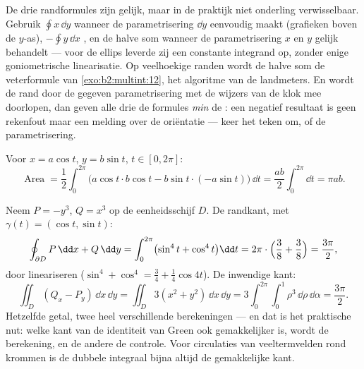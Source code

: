 \begin{remark}
De drie randformules zijn gelijk, maar in de praktijk niet
onderling verwisselbaar. Gebruik $\oint x\,\dd y$ wanneer de
parametrisering $\dd y$ eenvoudig maakt (grafieken boven de
$y$-as), $-\oint y\,\dd x$ , en de  halve
som wanneer de parametrisering $x$ en $y$ gelijk behandelt --- voor
de ellips leverde zij een constante integrand op, zonder enige
goniometrische linearisatie. Op veelhoekige randen wordt de halve
som de veterformule van \cref{exo:b2:multint:12}, het algoritme van
de landmeters. En wordt de rand door de gegeven parametrisering met
de wijzers van de klok mee doorlopen, dan geven alle drie de
formules \emph{min} de : een negatief resultaat is geen
rekenfout maar een melding over de oriëntatie --- keer het teken
om, of de parametrisering.
\end{remark}

\begin{example}\label{ex:b2:multint:ellipsearea}
Voor $x = a\cos t$, $y = b\sin t$, $t \in [0, 2\pi]$:
\[
\operatorname{Area}
= \frac12\int_0^{2\pi}\bigl(a\cos t \cdot b\cos t
- b\sin t\cdot(-a\sin t)\bigr)\,\dd t
= \frac{ab}{2}\int_0^{2\pi}\dd t = \pi ab .
\]
\end{example}

\begin{example}\label{ex:b2:multint:greencheck}
Neem $P = -y^3$, $Q = x^3$ op de  eenheidsschijf $D$. De
randkant, met $\gamma(t) = (\cos t, \sin t)$:
\[
\oint_{\partial D}P\,\dd x + Q\,\dd y
= \int_0^{2\pi}\bigl(\sin^4 t + \cos^4 t\bigr)\dd t
= 2\pi\cdot\Bigl(\frac38 + \frac38\Bigr) = \frac{3\pi}2 ,
\]
door lineariseren ($\sin^4 + \cos^4 = \tfrac34 +
\tfrac14\cos4t$). De inwendige kant:
\[
\iint_D(Q_x - P_y)\,\dd x\,\dd y
= \iint_D 3(x^2 + y^2)\,\dd x\,\dd y
= 3\int_0^{2\pi}\!\!\int_0^1\rho^3\,\dd\rho\,\dd\alpha
= \frac{3\pi}2 .
\]
Hetzelfde getal, twee heel verschillende berekeningen --- en dat is
het praktische nut: welke kant van de identiteit van Green ook
gemakkelijker is, wordt de berekening, en de andere de controle.
Voor circulaties van veeltermvelden rond  krommen is de
dubbele integraal bijna altijd de gemakkelijke kant.
\end{example}

